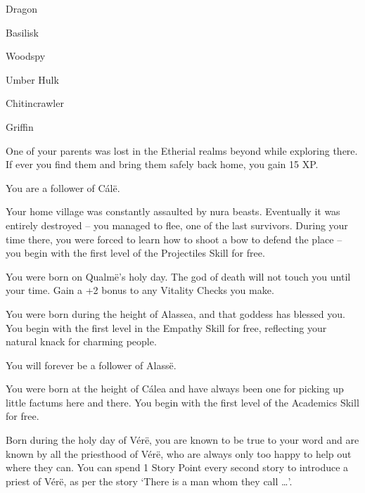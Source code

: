 \begin{multicols}{2}
\begin{list}{\addtocounter{list}{1}\textbf{:}}{\raggedleft}
\begin{list}{\addtocounter{enc}{-1}}{}
		\item Dragon

		\item Basilisk

		\item Woodspy

		\item Umber Hulk

		\item Chitincrawler

		\item Griffin

	\end{list}

	\item
	One of your parents was lost in the Etherial realms beyond while exploring there.
	If ever you find them and bring them safely back home, you gain 15 XP.

	You are a follower of C\'al\"e.

	\item
	Your home village was constantly assaulted by nura beasts.
	Eventually it was entirely destroyed -- you managed to flee, one of the last survivors.
	During your time there, you were forced to learn how to shoot a bow to defend the place -- you begin with the first level of the Projectiles Skill for free.

	\item
	You were born on Qualm\"{e}'s holy day.
	The god of death will not touch you until your time.
	Gain a +2 bonus to any Vitality Checks you make.

	\item
	You were born during the height of Alassea, and that goddess has blessed you.
	You begin with the first level in the Empathy Skill for free, reflecting your natural knack for charming people.

	You will forever be a follower of Alass\"e.

	\item
	You were born at the height of C\'{a}lea and have always been one for picking up little factums here and there.
	You begin with the first level of the Academics Skill for free.

	\item
	Born during the holy day of V\'{e}r\"{e}, you are known to be true to your word and are known by all the priesthood of V\'{e}r\"{e}, who are always only too happy to help out where they can.
	You can spend 1 Story Point every second story to introduce a priest of V\'{e}r\"{e}, as per the story `There is a man whom they call \ldots'.


\end{list}
\end{multicols}
